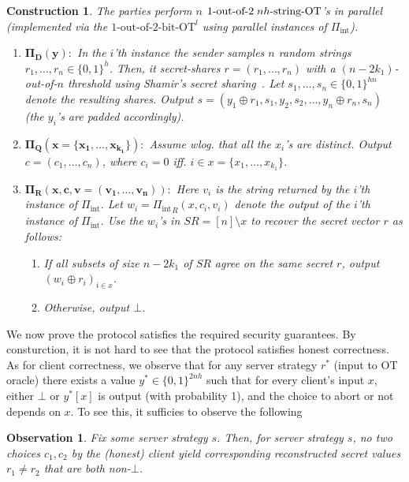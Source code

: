 \documentclass[a4paper]{article}
\newtheorem{observation}{Observation}
\newtheorem{construction}{Construction}
\newcommand{\OT}[2]{#1\text{-out-of-}#2\text{-bit-OT}}
\newcommand{\sOT}[3]{#1\text{-out-of-}#2\text{\;$#3$-string-OT}}
\newcommand{\INT}{\Pi_{\text{int}}}
\begin{document}
\begin{construction}
	The parties perform $n$ $\sOT{1}{2}{nh}$'s in parallel (implemented via the ${\OT{1}{2}}^l$ using parallel instances of $\INT$).  
		\begin{enumerate} 
			\item $\mathbf{\Pi_D(y):}$ In the $i$'th instance the sender samples $n$ random strings $r_1,\ldots,r_n\in\{0,1\}^h$. Then, it secret-shares $r=(r_1,\ldots,r_n)$ with a $(n-2k_1)$-out-of-$n$ threshold using Shamir's secret sharing~\cite{Shamir79}. Let $s_1,\ldots,s_n\in \{0,1\}^{hn}$ denote the resulting shares. Output $s = (y_1\oplus r_1,s_1,y_2,s_2,\ldots,y_n\oplus r_n,s_n)$ (the $y_i$'s are padded accordingly).
			\item $\mathbf{\Pi_Q(x=\{x_1,\ldots,x_{k_1}\}):}$ Assume wlog. that all the $x_i$'s are distinct. Output $c=(c_1,\ldots,c_n)$, where $c_i=0$ iff. $i\in x = \{x_1,\ldots,x_{k_1}\}$.
			\item $\mathbf{\Pi_R(x,c,v=(v_1,\ldots,v_n)):}$ Here $v_i$ is the string returned by the $i$'th instance of $\INT$.
			Let $w_i = {\INT}_R(x,c_i,v_i)$ denote the output of the $i$'th instance of $\INT$. Use the $w_i$'s in $SR=[n]\setminus{x}$ to recover the secret vector $r$ as follows:
		\begin{enumerate}
		 \item If all subsets of size $n-2k_1$ of $SR$ agree on the same secret $r$, output $(w_i\oplus r_i)_{i\in x}$. 
		 \item Otherwise, output $\bot$.   
		\end{enumerate}
	\end{enumerate}
\end{construction}


We now prove the protocol satisfies the required security guarantees.
By consturction, it is not hard to see that the protocol satisfies honest correctness. As for client correctness, we observe that for any server strategy $r^*$ (input to OT oracle) there exists a value $y^*\in\{0,1\}^{2nh}$ such that for every client's input $x$, 
either $\bot$ or $y^*[x]$ is output (with probability 1), and the choice to abort or not depends on $x$. To see this, it sufficies to observe the following

\begin{observation}\label{obs-1}
Fix some server strategy $s$. Then, for server strategy $s$, no two choices $c_1,c_2$ by the (honest) client yield corresponding reconstructed secret values $r_1\neq r_2$ that are both non-$\bot$. 	
\end{observation}
\end{document}

